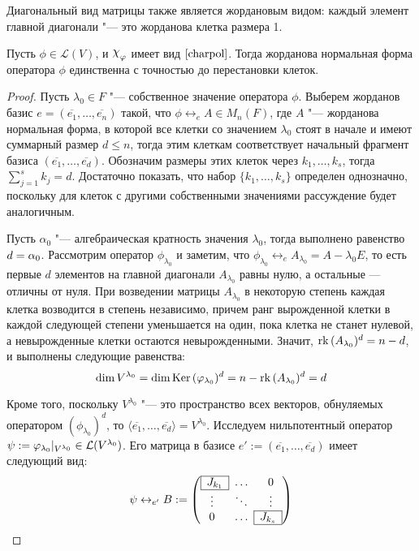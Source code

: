 \begin{note}
	Диагональный вид матрицы также является жордановым видом: каждый элемент главной диагонали "--- это жорданова клетка размера 1.
\end{note}

\begin{theorem}
	Пусть $\phi \in \mathcal{L}(V)$, и $\Chi_\phi$ имеет вид $\eqref*{charpol}$. Тогда жорданова нормальная форма оператора $\phi$ единственна с точностью до перестановки клеток.
\end{theorem}

\begin{proof}
	Пусть $\lambda_0 \in F$ "--- собственное значение оператора $\phi$. Выберем жорданов базис $e = (\overline{e_1}, \dotsc, \overline{e_n})$ такой, что $\phi \leftrightarrow_e A \in M_n(F)$, где $A$ "--- жорданова нормальная форма, в которой все клетки со значением $\lambda_0$ стоят в начале и имеют суммарный размер $d \le n$, тогда этим клеткам соответствует начальный фрагмент базиса $(\overline{e_1}, \dotsc, \overline{e_d})$. Обозначим размеры этих клеток через $k_1, \dotsc, k_s$, тогда $\sum_{j = 1}^sk_j = d$. Достаточно показать, что набор $\{k_1, \dots, k_s\}$ определен однозначно, поскольку для клеток с другими собственными значениями рассуждение будет аналогичным.
	
	Пусть $\alpha_0$ "--- алгебраическая кратность значения $\lambda_0$, тогда выполнено равенство $d \hm{=} \alpha_0$. Рассмотрим оператор $\phi_{\lambda_0}$ и заметим, что $\phi_{\lambda_0} \leftrightarrow_e A_{\lambda_0} = A -\lambda_0E$, то есть первые $d$ элементов на главной диагонали $A_{\lambda_0}$ равны нулю, а остальные --- отличны от нуля. При возведении матрицы $A_{\lambda_0}$ в некоторую степень каждая клетка возводится в степень независимо, причем ранг вырожденной клетки в каждой следующей степени уменьшается на один, пока клетка не станет нулевой, а невырожденные клетки остаются невырожденными. Значит, $\operatorname{rk}{(A_{\lambda_0})^d} = n - d$, и выполнены следующие равенства:
	\[\dim{V^{\lambda_0}} = \dim{\operatorname{Ker}{(\ensuremath{\varphi}_{\lambda_0})^d}} = n - \operatorname{rk}{(A_{\lambda_0})^d} = d\]
	
	Кроме того, поскольку $V^{\lambda_0}$ "--- это пространство всех векторов, обнуляемых оператором $(\phi_{\lambda_0})^d$, то $\langle\overline{e_1}, \dots, \overline{e_d}\rangle = V^{\lambda_0}$. Исследуем нильпотентный оператор $\psi := \varphi_{\lambda_0}|_{V^{\lambda_0}} \in \mathcal L(V^{\lambda_0})$. Его матрица в базисе $e' := (\overline{e_1}, \dots, \overline{e_d})$ имеет следующий вид:
	\[\psi \leftrightarrow_{e'} B := \left(\begin{array}{@{}ccc@{}}
		\cline{1-1}
		\multicolumn{1}{|c|}{J_{k_1}} & \dots & 0\\
		\cline{1-1}
		\vdots & \ddots & \vdots\\
		\cline{3-3}
		0 & \dots & \multicolumn{1}{|c|}{J_{k_s}}\\
		\cline{3-3}
	\end{array}\right)\]
	

\end{proof}
